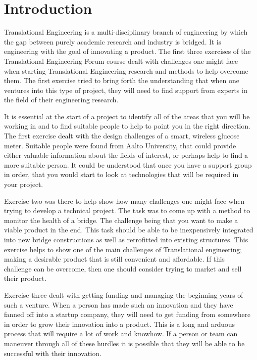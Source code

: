 \documentclass[english,12pt,a4paper,pdftex,elec,utf8]{aaltothesis}
\begin{document}
\fi

\cleardoublepage
\storeinipagenumber
{}
\setcounter{page}{1}
\thispagestyle{empty}


\section*{Introduction}

	Translational Engineering is a multi-disciplinary branch of engineering by which the gap between purely academic research and industry is bridged. It is engineering with the goal of innovating a product. The first three exercises of the Translational Engineering Forum course dealt with challenges one might face when starting Translational Engineering research and methods to help overcome them. The first exercise tried to bring forth the understanding that when one ventures into this type of project, they will need to find support from experts in the field of their engineering research.  

	It is essential at the start of a project to identify all of the areas that you will be working in and to find suitable people to help to point you in the right direction. The first exercise dealt with the design challenges of a smart, wireless glucose meter. Suitable people were found from Aalto University, that could provide either valuable information about the fields of interest, or perhaps help to find a more suitable person. It could be understood that once you have a support group in order, that you would start to look at technologies that will be required in your project. 
	
	Exercise two was there to help show how many challenges one might face when trying to develop a technical project. The task was to come up with a method to monitor the health of a bridge. The challenge being that you want to make a viable product in the end. This task should be able to be inexpensively integrated into new bridge constructions as well as retrofitted into existing structures. This exercise helps to show one of the main challenges of Translational engineering; making a desirable product that is still convenient and affordable. If this challenge can be overcome, then one should consider trying to market and sell their product. 
	
	Exercise three dealt with getting funding and managing the beginning years of such a venture. When a person has made such an innovation and they have fanned off into a startup company, they will need to get funding from somewhere in order to grow their innovation into a product. This is a long and arduous process that will require a lot of work and knowhow. If a person or team can maneuver through all of these hurdles it is possible that they will be able to be successful with their innovation. 
	
\end{document}
